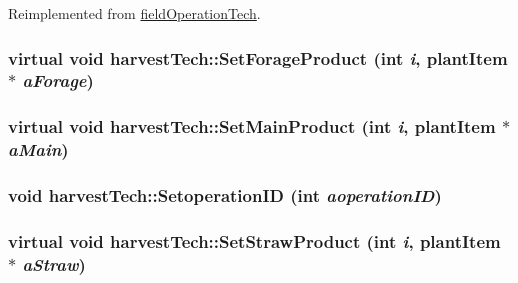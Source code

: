 Reimplemented from \hyperlink{classfield_operation_tech_a2a2c416f3f3fe8ceb2f1f1b63c149a09}{fieldOperationTech}.\hypertarget{classharvest_tech_a4e255e621cdcd9c4c1ce3a01fad834b7}{
\subsubsection[{SetForageProduct}]{\setlength{\rightskip}{0pt plus 5cm}virtual void harvestTech::SetForageProduct (int {\em i}, \/  {\bf plantItem} $\ast$ {\em aForage})}}
\label{classharvest_tech_a4e255e621cdcd9c4c1ce3a01fad834b7}
\hypertarget{classharvest_tech_a08dcfb181357050af56db22695c5c90e}{
\subsubsection[{SetMainProduct}]{\setlength{\rightskip}{0pt plus 5cm}virtual void harvestTech::SetMainProduct (int {\em i}, \/  {\bf plantItem} $\ast$ {\em aMain})}}
\label{classharvest_tech_a08dcfb181357050af56db22695c5c90e}
\hypertarget{classharvest_tech_ae5e426c9daf76eb383bc475c15dd069f}{
\subsubsection[{SetoperationID}]{\setlength{\rightskip}{0pt plus 5cm}void harvestTech::SetoperationID (int {\em aoperationID})}}
\label{classharvest_tech_ae5e426c9daf76eb383bc475c15dd069f}
\hypertarget{classharvest_tech_ada5009f15cedc20583c711df035af86f}{
\subsubsection[{SetStrawProduct}]{\setlength{\rightskip}{0pt plus 5cm}virtual void harvestTech::SetStrawProduct (int {\em i}, \/  {\bf plantItem} $\ast$ {\em aStraw})}}
